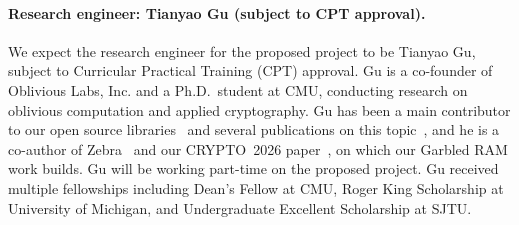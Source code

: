 \paragraph{Research engineer: Tianyao Gu (subject to CPT approval).}
We expect the research engineer for the proposed project to be Tianyao Gu,
subject to Curricular Practical Training (CPT) approval. Gu is a co-founder
of Oblivious Labs, Inc. and a Ph.D.\
student at CMU, conducting research on oblivious computation and applied
cryptography. Gu has been a main contributor to our open source
libraries~\cite{olabs-okv,ostl} and several publications on this
topic~\cite{flexosort,picogram}, and he is a co-author of
Zebra~\cite{zebra} and our CRYPTO~2026 paper~\cite{mparithgarble}, on which
our Garbled RAM work builds. Gu will be working part-time on the proposed
project. 
Gu 
received multiple fellowships including Dean's Fellow at CMU, Roger King
Scholarship at University of Michigan, and Undergraduate Excellent
Scholarship at SJTU.
